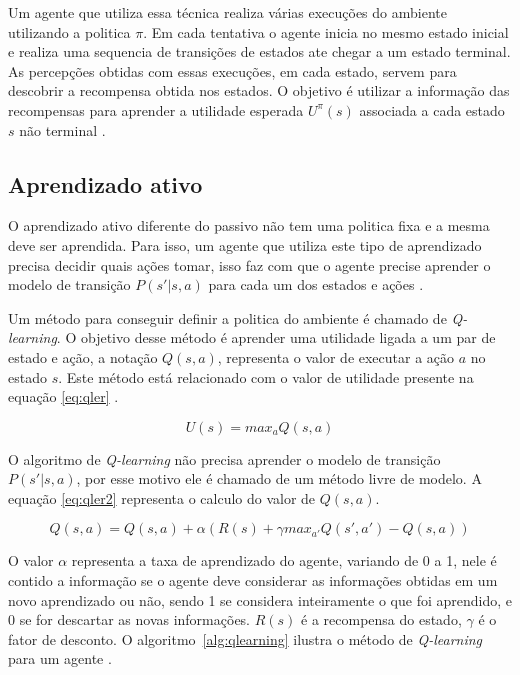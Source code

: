 Um agente que utiliza essa técnica realiza várias execuções do ambiente utilizando a politica $\pi$. Em cada tentativa o agente inicia no mesmo estado inicial e realiza uma sequencia de transições de estados ate chegar a um estado terminal. As percepções obtidas com essas execuções, em cada estado, servem para descobrir a recompensa obtida nos estados. O objetivo é utilizar a informação das recompensas para aprender a utilidade esperada $U^{\pi}(s)$ associada a cada estado $s$ não terminal \cite{intelligence2003modern}. 

\subsection{Aprendizado ativo}

O aprendizado ativo diferente do passivo não tem uma politica fixa e a mesma deve ser aprendida. Para isso, um agente que utiliza este tipo de aprendizado precisa decidir quais ações tomar, isso faz com que o agente precise aprender o modelo de transição $P(s' | s, a)$ para cada um dos estados e ações \cite{intelligence2003modern}. 

Um método para conseguir definir a politica do ambiente é chamado de \textit{Q-learning}. O objetivo desse método é aprender uma utilidade ligada a um par de estado e ação, a notação $Q(s, a)$, representa o valor de executar a ação $a$ no estado $s$. Este método está relacionado com o valor de utilidade presente na equação \ref{eq:qler} \cite{intelligence2003modern}.

\begin{equation}
\label{eq:qler}	
	U(s) =  max_{a} Q(s, a)
\end{equation}

O algoritmo de \textit{Q-learning} não precisa aprender o modelo de transição $P(s' | s, a)$, por esse motivo ele é chamado de um método livre de modelo. A equação \ref{eq:qler2} representa o calculo do valor de $Q(s, a)$.

\begin{equation}
\label{eq:qler2}	
Q(s, a) = Q(s, a) + \alpha (R(s) + \gamma max_{a'} Q(s', a') - Q(s, a))
\end{equation}

O valor $\alpha$ representa a taxa de aprendizado do agente, variando de 0 a 1, nele é contido a informação se o agente deve considerar as informações obtidas em um novo aprendizado ou não, sendo 1 se considera inteiramente o que foi aprendido, e 0 se for descartar as novas informações. 
$R(s)$ é a recompensa do estado, $\gamma$ é o fator de desconto. 
O algoritmo~\ref{alg:qlearning} ilustra o método de \textit{Q-learning} para um agente \cite{intelligence2003modern}.


